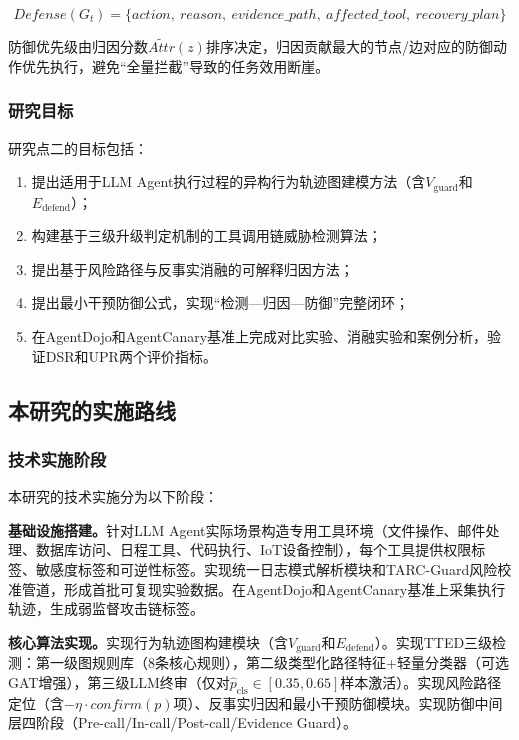 \begin{equation}
  Defense(G_t) = \{action,\ reason,\ evidence\_path,\ affected\_tool,\ recovery\_plan\}
\end{equation}

防御优先级由归因分数$\widetilde{Attr}(z)$排序决定，归因贡献最大的节点/边对应的防御动作优先执行，避免“全量拦截”导致的任务效用断崖。

\subsubsection{研究目标}

研究点二的目标包括：
\begin{enumerate}
  \item 提出适用于LLM Agent执行过程的异构行为轨迹图建模方法（含$V_{\text{guard}}$和$E_{\text{defend}}$）；
  \item 构建基于三级升级判定机制的工具调用链威胁检测算法；
  \item 提出基于风险路径与反事实消融的可解释归因方法；
  \item 提出最小干预防御公式，实现“检测—归因—防御”完整闭环；
  \item 在AgentDojo和AgentCanary基准上完成对比实验、消融实验和案例分析，验证DSR和UPR两个评价指标。
\end{enumerate}

\subsection{本研究的实施路线}

\subsubsection{技术实施阶段}
本研究的技术实施分为以下阶段：

\textbf{基础设施搭建。}针对LLM Agent实际场景构造专用工具环境（文件操作、邮件处理、数据库访问、日程工具、代码执行、IoT设备控制），每个工具提供权限标签、敏感度标签和可逆性标签。实现统一日志模式解析模块和TARC-Guard风险校准管道，形成首批可复现实验数据。在AgentDojo和AgentCanary基准上采集执行轨迹，生成弱监督攻击链标签。

\textbf{核心算法实现。}实现行为轨迹图构建模块（含$V_{\text{guard}}$和$E_{\text{defend}}$）。实现TTED三级检测：第一级图规则库（8条核心规则），第二级类型化路径特征+轻量分类器（可选GAT增强），第三级LLM终审（仅对$\hat{p}_{\text{cls}} \in [0.35, 0.65]$样本激活）。实现风险路径定位（含$-\eta \cdot confirm(p)$项）、反事实归因和最小干预防御模块。实现防御中间层四阶段（Pre-call/In-call/Post-call/Evidence Guard）。

